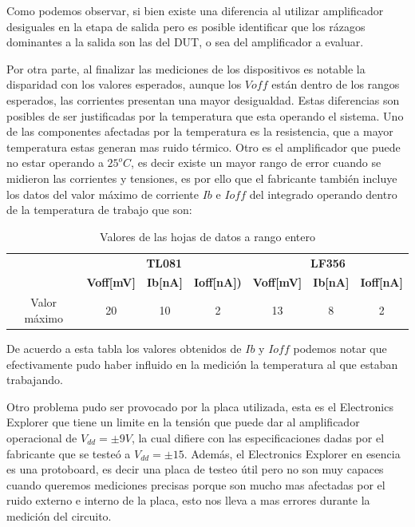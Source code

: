 Como podemos observar, si bien existe una diferencia al utilizar amplificador desiguales en la etapa de salida pero es posible identificar que los rázagos dominantes a la salida son las del DUT, o sea del amplificador a evaluar. 

Por otra parte, al finalizar las mediciones de los dispositivos es notable la disparidad con los valores esperados, aunque los $Voff$ están dentro de los rangos esperados, las corrientes presentan una mayor desigualdad. Estas diferencias son posibles de ser justificadas por la temperatura que esta operando el sistema. Uno de las componentes afectadas por la temperatura es la resistencia, que a mayor temperatura estas generan mas ruido térmico. Otro es el amplificador que puede no estar operando a $25^o C$, es decir existe un mayor rango de error cuando se midieron las corrientes y tensiones, es por ello que el fabricante también incluye los datos del valor máximo de corriente $Ib$ e $Ioff$ del integrado operando dentro de la temperatura de trabajo que son:
\begin{table}[h]
\centering
\begin{tabular}{c|ccc|ccc}
\toprule
               & \multicolumn{3}{c|}{\textbf{TL081}}            & \multicolumn{3}{c}{\textbf{LF356}}    \\
               & \textbf{Voff[mV]} & \textbf{Ib[nA]} & \textbf{Ioff[nA])} & \textbf{Voff[mV]} & \textbf{Ib[nA]} & \textbf{Ioff[nA]} \\
\hline
Valor m\'aximo & 20           & 10   & 2    & 13            & 8       & 2       \\
\hline
\end{tabular}
\caption{Valores de las hojas de datos a rango entero}
\label{tab:ej2datasheet1}
\end{table}

De acuerdo a esta tabla los valores obtenidos de $Ib$ y $Ioff$ podemos notar que efectivamente pudo haber influido en la medición la temperatura al que estaban trabajando. 

Otro problema pudo ser provocado por la placa utilizada, esta es el Electronics Explorer que tiene un limite en la tensión que puede dar al amplificador operacional de $V_{dd} = \pm9V$, la cual difiere con las especificaciones dadas por el fabricante que se testeó a $V_{dd} = \pm 15$. Además, el Electronics Explorer en esencia es una protoboard, es decir una placa de testeo útil pero no son muy capaces cuando queremos mediciones precisas porque son mucho mas afectadas por el ruido externo e interno de la placa, esto nos lleva a mas errores durante la medición del circuito. 

